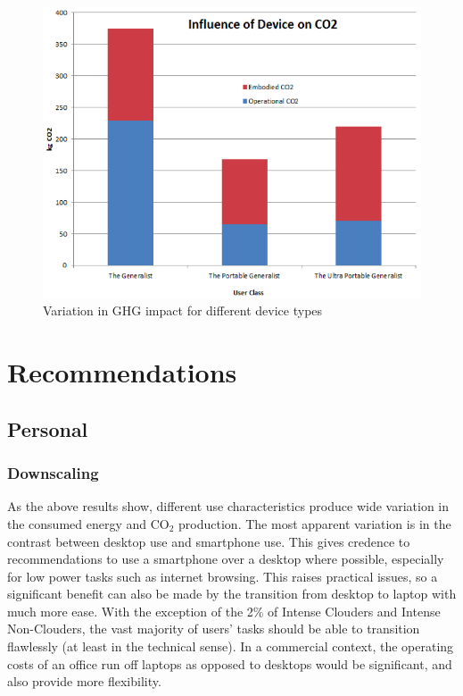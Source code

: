 \documentclass[conference]{IEEEtran}
\begin{document}
\begin{figure}
\centering
\includegraphics[width=0.9\columnwidth]{images/ghgimpact_devicetypes.png}
\caption{Variation in GHG impact for different device types}
\label{fig:ghgimpact_devicetype} 
\end{figure}

\section{Recommendations}

\subsection{Personal}

\subsubsection{Downscaling}

As the above results show, different use characteristics produce wide
variation in the consumed energy and CO$_2$ production. The most
apparent variation is in the contrast between desktop use and
smartphone use. This gives credence to recommendations to use a
smartphone over a desktop where possible, especially for low power
tasks such as internet browsing. This raises practical issues, so a
significant benefit can also be made by the transition from desktop to
laptop with much more ease. With the exception of the 2\% of Intense
Clouders and Intense Non-Clouders, the vast majority of users' tasks
should be able to transition flawlessly (at least in the technical
sense).
In a commercial context, the operating costs of an office run off
laptops as opposed to desktops would be significant, and also provide
more flexibility.
\end{document}
